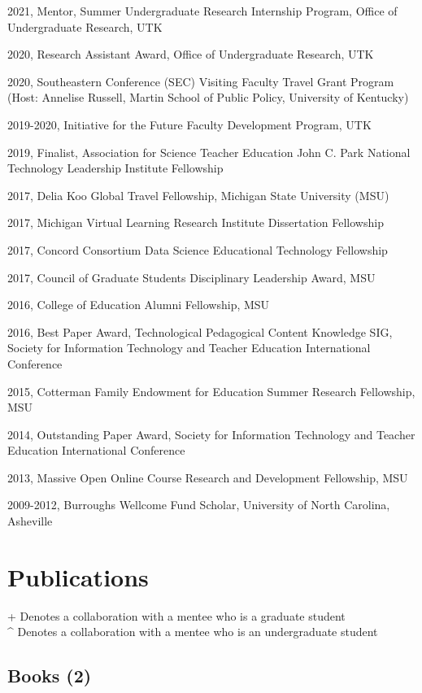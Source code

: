 \documentclass[
  14,
]{article}
\begin{document}
2021, Mentor, Summer Undergraduate Research Internship Program, Office
of Undergraduate Research, UTK

2020, Research Assistant Award, Office of Undergraduate Research, UTK

2020, Southeastern Conference (SEC) Visiting Faculty Travel Grant
Program (Host: Annelise Russell, Martin School of Public Policy,
University of Kentucky)

2019-2020, Initiative for the Future Faculty Development Program, UTK

2019, Finalist, Association for Science Teacher Education John C. Park
National Technology Leadership Institute Fellowship

2017, Delia Koo Global Travel Fellowship, Michigan State University
(MSU)

2017, Michigan Virtual Learning Research Institute Dissertation
Fellowship

2017, Concord Consortium Data Science Educational Technology Fellowship

2017, Council of Graduate Students Disciplinary Leadership Award, MSU

2016, College of Education Alumni Fellowship, MSU

2016, Best Paper Award, Technological Pedagogical Content Knowledge SIG,
Society for Information Technology and Teacher Education International
Conference

2015, Cotterman Family Endowment for Education Summer Research
Fellowship, MSU

2014, Outstanding Paper Award, Society for Information Technology and
Teacher Education International Conference

2013, Massive Open Online Course Research and Development Fellowship,
MSU

2009-2012, Burroughs Wellcome Fund Scholar, University of North
Carolina, Asheville

\hypertarget{publications}{%
\section{Publications}\label{publications}}

+ Denotes a collaboration with a mentee who is a graduate student\\
\^{} Denotes a collaboration with a mentee who is an undergraduate
student

\hypertarget{books-2}{%
\subsection{Books (2)}\label{books-2}}
\end{document}
